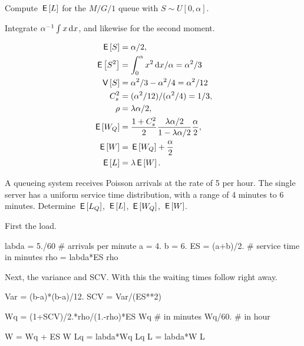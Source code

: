 \begin{exercise}[\faCalculator]
  Compute $\,\mathsf{E}\left[L\right]$ for the $M/G/1$ queue with $S\sim U[0,\alpha]$.
  \begin{hint}
Integrate $\alpha^{-1} \int x \,\text{d}x$, and likewise for the second moment.
  \end{hint}
\begin{solution}
  \begin{align*}
\,\mathsf{E}\left[S\right] &= \alpha/2,\\
\,\mathsf{E}\left[S^2\right] &= \int_0^\alpha x^2 \,\text{d}x/\alpha = \alpha^2/3\\
\,\mathsf{V}\left[S\right] &= \alpha^2/3 - \alpha^2/4= \alpha^2/12\\
C_s^2 &= (\alpha^2/12)/(\alpha^2/4) = 1/3,\\
\rho &= \lambda \alpha/2,\\
\,\mathsf{E}\left[W_Q\right] &= \frac{1+C_s^2}2 \frac{\lambda \alpha/2}{1-\lambda \alpha/2}\frac \alpha2, \\
\,\mathsf{E}\left[W\right] &= \,\mathsf{E}\left[W_Q\right] + \frac \alpha2\\
\,\mathsf{E}\left[L\right] &= \lambda \,\mathsf{E}\left[W\right].
  \end{align*}
\end{solution}
\end{exercise}

\begin{exercise}[\faPhoto]
  A queueing system receives Poisson arrivals at the rate of 5 per
  hour. The single server has a uniform service time distribution,
  with a range of 4 minutes to 6 minutes. Determine $\,\mathsf{E}\left[L_Q\right]$, $\,\mathsf{E}\left[L\right]$,
  $\,\mathsf{E}\left[W_Q\right]$, $\,\mathsf{E}\left[W\right]$.
  \begin{solution}
First the load.
\begin{pyconsole}
labda = 5./60 # arrivals per minute
a = 4.
b = 6.
ES = (a+b)/2.  # service time in minutes
rho = labda*ES
rho
\end{pyconsole}

Next, the variance and SCV. With this the waiting times follow right away.
\begin{pyconsole}
Var = (b-a)*(b-a)/12.
SCV = Var/(ES**2)


Wq = (1+SCV)/2.*rho/(1.-rho)*ES
Wq # in minutes
Wq/60. # in hour


W = Wq + ES
W
Lq = labda*Wq
Lq
L = labda*W
L
\end{pyconsole}
  \end{solution}
\end{exercise}



